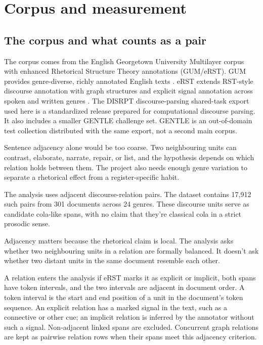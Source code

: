\documentclass[12pt]{article}
\begin{document}
\section{Corpus and measurement}

\subsection{The corpus and what counts as a pair}

The corpus comes from the English Georgetown University Multilayer corpus
with enhanced Rhetorical Structure Theory annotations (GUM/eRST). GUM
provides genre-diverse, richly annotated English texts
\citep{zeldes2017GUMCorpus}. eRST extends RST-style discourse annotation
with graph structures and explicit signal annotation across spoken and
written genres \citep{zeldesEtAl2025eRST}. The DISRPT discourse-parsing
shared-task export used here is a standardized release prepared for
computational discourse parsing. It also includes a smaller GENTLE challenge set.
GENTLE is an out-of-domain test collection distributed with the same export,
not a second main corpus.

Sentence adjacency alone would be too coarse. Two neighbouring units can
contrast, elaborate, narrate, repair, or list, and the hypothesis depends on
which relation holds between them. The project also needs enough genre
variation to separate a rhetorical effect from a register-specific habit.

The analysis uses adjacent discourse-relation pairs. The dataset
contains 17,912 such pairs from 301 documents across 24 genres.
These discourse units serve as candidate cola-like spans, with no claim
that they're classical cola in a strict prosodic sense.

Adjacency matters because the rhetorical claim is local. The analysis asks
whether two neighbouring units in a relation are formally balanced. It
doesn't ask whether two distant units in the same document resemble each
other.

A relation enters the analysis if eRST marks it as explicit or implicit,
both spans have token intervals, and the two intervals are adjacent in
document order. A token interval is the start and end position of a unit in
the document's token sequence. An explicit relation has a marked signal in the text, such
as a connective or other cue; an implicit relation is inferred by the
annotator without such a signal. Non-adjacent linked spans are excluded. Concurrent graph
relations are kept as pairwise relation rows when their spans meet this
adjacency criterion.
\end{document}
